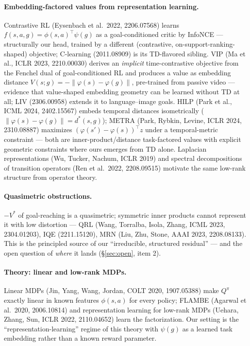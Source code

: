 \documentclass[11pt]{article}
\begin{document}
\paragraph{Embedding-factored values from representation learning.} Contrastive RL
(Eysenbach et al.\ 2022, 2206.07568) learns $f(s,a,g)=\phi(s,a)^\top\psi(g)$ as a
goal-conditioned critic by InfoNCE --- structurally our head, trained by a different
(contrastive, on-support-ranking-shaped) objective; C-learning (2011.08909) is its
TD-flavored sibling. VIP (Ma et al., ICLR 2023, 2210.00030) derives an \emph{implicit}
time-contrastive objective from the Fenchel dual of goal-conditioned RL and produces a value
as embedding distance $V(s;g)=-\|\varphi(s)-\varphi(g)\|$, pre-trained from passive video
--- evidence that value-shaped embedding geometry can be learned without TD at all; LIV
(2306.00958) extends it to language--image goals. HILP (Park et al., ICML 2024, 2402.15567)
embeds temporal distances isometrically ($\|\varphi(s)-\varphi(g)\|=d^*(s,g)$); METRA
(Park, Rybkin, Levine, ICLR 2024, 2310.08887) maximizes $(\varphi(s')-\varphi(s))^\top z$
under a temporal-metric constraint --- both are inner-product/distance task-factored values
with explicit geometric constraints where ours emerges from TD alone. Laplacian
representations (Wu, Tucker, Nachum, ICLR 2019) and spectral decompositions of transition
operators (Ren et al.\ 2022, 2208.09515) motivate the same low-rank structure from operator
theory.

\paragraph{Quasimetric obstructions.} $-V^*$ of goal-reaching is a quasimetric; symmetric
inner products cannot represent it with low distortion --- QRL (Wang, Torralba, Isola,
Zhang, ICML 2023, 2304.01203), IQE (2211.15120), MRN (Liu, Zhu, Stone, AAAI 2023,
2208.08133). This is the principled source of our ``irreducible, structured residual'' ---
and the open question of \emph{where} it lands (\S\ref{sec:open}, item 2).

\paragraph{Theory: linear and low-rank MDPs.} Linear MDPs (Jin, Yang, Wang, Jordan, COLT
2020, 1907.05388) make $Q^\pi$ exactly linear in known features $\phi(s,a)$ for every
policy; FLAMBE (Agarwal et al.\ 2020, 2006.10814) and representation learning for low-rank
MDPs (Uehara, Zhang, Sun, ICLR 2022, 2110.04652) learn the factorization. Our setting is
the ``representation-learning'' regime of this theory with $\psi(g)$ as a learned task
embedding rather than a known reward parameter.
\end{document}
